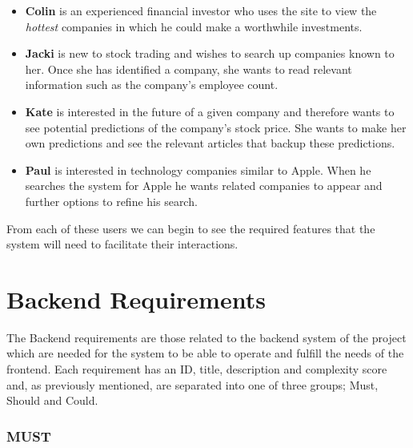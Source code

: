         \begin{itemize}
    
        \item \textbf{Colin} is an experienced financial investor who uses the site to view the \textit{hottest} companies in which he could make a worthwhile investments. 
        
        \item \textbf{Jacki} is new to stock trading and wishes to search up companies known to her. Once she has identified a company, she wants to read relevant information such as the company's employee count.
        
        \item \textbf{Kate} is interested in the future of a given company and therefore wants to see potential predictions of the company's stock price. She wants to make her own predictions and see the relevant articles that backup these predictions.
        
        \item \textbf{Paul} is interested in technology companies similar to Apple. When he searches the system for Apple he wants related companies to appear and further options to refine his search.
    
        \end{itemize}
    
    From each of these users we can begin to see the required features that the system will need to facilitate their interactions. 
    
\section{Backend Requirements}
The Backend requirements are those related to the backend system of the project which are needed for the system to be able to operate and fulfill the needs of the frontend. Each requirement has an ID, title, description and complexity score and, as previously mentioned, are separated into one of three groups; Must, Should and Could.  

    \BlankLine
    \BlankLine
    \subsubsection{MUST}
    \BlankLine
    \phantom{~}\noindent
   

